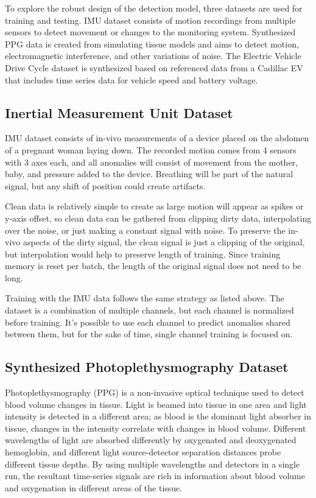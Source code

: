 \documentclass[conference]{IEEEtran}
\begin{document}
To explore the robust design of the detection model, three datasets are used for training and testing. IMU dataset consists of motion recordings from multiple sensors to detect movement or changes to the monitoring system. Synthesized PPG data is created from simulating tissue models and aims to detect motion, electromagnetic interference, and other variations of noise. The Electric Vehicle Drive Cycle dataset is synthesized based on referenced data from a Cadillac EV that includes time series data for vehicle speed and battery voltage.

\subsection{Inertial Measurement Unit Dataset}
IMU dataset consists of in-vivo measurements of a device placed on the abdomen of a pregnant woman laying down. The recorded motion comes from 4 sensors with 3 axes each, and all anomalies will consist of movement from the mother, baby, and pressure added to the device. Breathing will be part of the natural signal, but any shift of position could create artifacts. 

Clean data is relatively simple to create as large motion will appear as spikes or y-axis offset, so clean data can be gathered from clipping dirty data, interpolating over the noise, or just making a constant signal with noise. To preserve the in-vivo aspects of the dirty signal, the clean signal is just a clipping of the original, but interpolation would help to preserve length of training. Since training memory is reset per batch, the length of the original signal does not need to be long.

Training with the IMU data follows the same strategy as listed above. The dataset is a combination of multiple channels, but each channel is normalized before training. It’s possible to use each channel to predict anomalies shared between them, but for the sake of time, single channel training is focused on.

\subsection{Synthesized Photoplethysmography Dataset}
Photoplethysmography (PPG) is a non-invasive optical technique used to detect blood volume changes in tissue. Light is beamed into tissue in one area and light intensity is detected in a different area; as blood is the dominant light absorber in tissue, changes in the intensity correlate with changes in blood volume. Different wavelengths of light are absorbed differently by oxygenated and deoxygenated hemoglobin, and different light source-detector separation distances probe different tissue depths. By using multiple wavelengths and detectors in a single run, the resultant time-series signals are rich in information about blood volume and oxygenation in different areas of the tissue.
\end{document}
